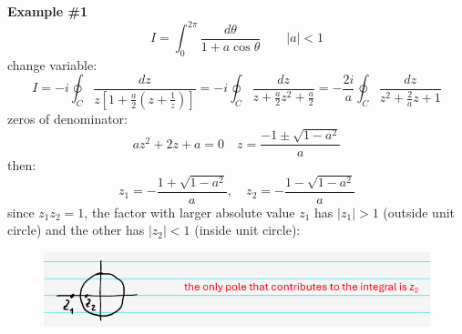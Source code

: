 \documentclass{article}
\begin{document}
\noindent
\textbf{Example \#1}
\begin{equation}
    I = \int_0^{2\pi} \frac{d\theta}{1 + a\cos\theta} \qquad |a| < 1
\end{equation}
change variable:
\begin{equation}
    I = -i \oint_C \frac{dz}{z \left[ 1 + \frac{a}{2}\left(z + \frac{1}{z} \right) \right]}
= -i \oint_C \frac{dz}{z + \frac{a}{2}z^2 + \frac{a}{2}}
= -\frac{2i}{a} \oint_C \frac{dz}{z^2 + \frac{2}{a}z + 1}
\end{equation}
zeros of denominator:
\begin{equation}
    az^2 + 2z + a = 0 \quad z = \frac{-1 \pm \sqrt{1-a^2}}{a}
\end{equation}
then:
\begin{equation}
    z_1 = -\frac{1 + \sqrt{1-a^2}}{a}, \quad z_2 = -\frac{1 - \sqrt{1-a^2}}{a}
\end{equation}
since $z_1 z_2 = 1$, the factor with larger absolute value $z_1$ has $|z_1|>1$ (outside unit circle) and the other has $|z_2|<1$ (inside unit circle):
\begin{figure}[h]
    \centering
    \includegraphics[width=0.75\linewidth]{fig36.png}
\end{figure}
\end{document}
